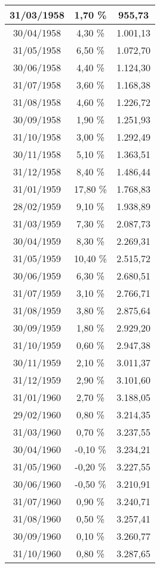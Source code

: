 \begin{center}
\begin{longtable}{|c|c|c|}
31/03/1958 & 1,70 \% & 955,73  \\ \hline
30/04/1958 & 4,30 \% & 1.001,13  \\ \hline
31/05/1958 & 6,50 \% & 1.072,70  \\ \hline
30/06/1958 & 4,40 \% & 1.124,30  \\ \hline
31/07/1958 & 3,60 \% & 1.168,38  \\ \hline
31/08/1958 & 4,60 \% & 1.226,72  \\ \hline
30/09/1958 & 1,90 \% & 1.251,93  \\ \hline
31/10/1958 & 3,00 \% & 1.292,49  \\ \hline
30/11/1958 & 5,10 \% & 1.363,51  \\ \hline
31/12/1958 & 8,40 \% & 1.486,44  \\ \hline
31/01/1959 & 17,80 \% & 1.768,83  \\ \hline
28/02/1959 & 9,10 \% & 1.938,89  \\ \hline
31/03/1959 & 7,30 \% & 2.087,73  \\ \hline
30/04/1959 & 8,30 \% & 2.269,31  \\ \hline
31/05/1959 & 10,40 \% & 2.515,72  \\ \hline
30/06/1959 & 6,30 \% & 2.680,51  \\ \hline
31/07/1959 & 3,10 \% & 2.766,71  \\ \hline
31/08/1959 & 3,80 \% & 2.875,64  \\ \hline
30/09/1959 & 1,80 \% & 2.929,20  \\ \hline
31/10/1959 & 0,60 \% & 2.947,38  \\ \hline
30/11/1959 & 2,10 \% & 3.011,37  \\ \hline
31/12/1959 & 2,90 \% & 3.101,60  \\ \hline
31/01/1960 & 2,70 \% & 3.188,05  \\ \hline
29/02/1960 & 0,80 \% & 3.214,35  \\ \hline
31/03/1960 & 0,70 \% & 3.237,55  \\ \hline
30/04/1960 & -0,10 \% & 3.234,21  \\ \hline
31/05/1960 & -0,20 \% & 3.227,55  \\ \hline
30/06/1960 & -0,50 \% & 3.210,91  \\ \hline
31/07/1960 & 0,90 \% & 3.240,71  \\ \hline
31/08/1960 & 0,50 \% & 3.257,41  \\ \hline
30/09/1960 & 0,10 \% & 3.260,77  \\ \hline
31/10/1960 & 0,80 \% & 3.287,65  \\ \hline

\end{longtable}
\end{center}
